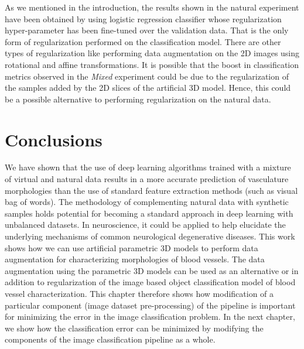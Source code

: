 As we mentioned in the introduction, the results shown in the natural experiment have been obtained by using logistic regression classifier whose regularization hyper-parameter has been fine-tuned over the validation data. That is the only form of regularization performed on the classification model. There are other types of regularization like performing data augmentation on the 2D images using rotational and affine transformations. It is possible that the boost in classification metrics observed in the \textit{Mixed} experiment could be due to the regularization of the samples added by the 2D slices of the artificial 3D model. Hence, this could be a possible alternative to performing regularization on the natural data.

\section{Conclusions}
We have shown that the use of deep learning algorithms  trained with a mixture of virtual and natural data  results in a more accurate prediction of vasculature morphologies than the use of standard feature extraction methods (such as visual bag of words). The methodology of complementing natural data with synthetic samples holds potential for becoming a standard approach in deep learning with unbalanced datasets. In neuroscience, it could be applied to help elucidate the underlying mechanisms of common neurological degenerative diseases.
This work shows how we can use artificial parametric 3D models to perform data augmentation for characterizing morphologies of blood vessels. The data augmentation using the parametric 3D models can be used as an alternative or in addition to regularization of the image based object classification model of blood vessel characterization.
 This chapter therefore shows how modification of a particular component (image dataset pre-processing) of the  pipeline is important for minimizing the error in the image classification problem. In the next chapter, we show how the classification error can be minimized by modifying the components of the image classification pipeline as a whole.